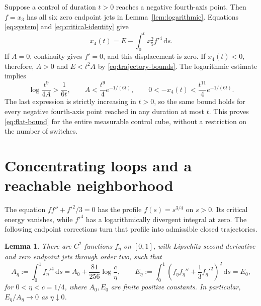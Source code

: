 \documentclass[11pt,a4paper]{article}
\newtheorem{lemma}[theorem]{Lemma}
\newcommand{\dd}{\,\mathrm{d}}
\begin{document}
Suppose a control of duration $t>0$ reaches a negative fourth-axis point.
Then $f=x_3$ has all six zero endpoint jets in
Lemma~\ref{lem:logarithmic}. Equations \eqref{eq:system} and
\eqref{eq:critical-identity} give
\begin{equation}\label{eq:fourth-displacement}
 x_4(t)=E-\int_0^t x_5^2f'^4\dd s.
\end{equation}
If $A=0$, continuity gives $f'=0$, and this displacement is zero.
If $x_4(t)<0$, therefore, $A>0$ and $E<t^2A$ by
\eqref{eq:trajectory-bounds}. The logarithmic estimate implies
\[
 \log\frac{t^9}{4A}>\frac1{6t},\qquad
 A<\frac{t^9}{4}e^{-1/(6t)},\qquad
 0<-x_4(t)<\frac{t^{11}}4e^{-1/(6t)}.
\]
The last expression is strictly increasing in $t>0$, so the same bound
holds for every negative fourth-axis point reached in any duration at most
$t$. This proves \eqref{eq:flat-bound} for the entire measurable control
cube, without a restriction on the number of switches.

\section{Concentrating loops and a reachable neighborhood}
\label{sec:controllability}

The equation $ff''+f'^2/3=0$ has the profile $f(s)=s^{3/4}$ on
$s>0$. Its critical energy vanishes, while $f'^4$ has a logarithmically
divergent integral at zero. The following endpoint corrections turn that
profile into admissible closed trajectories.

\begin{lemma}\label{lem:concentration}
There are $C^2$ functions $f_\eta$ on $[0,1]$, with Lipschitz second
derivative and zero endpoint jets through order two, such that
\begin{equation}\label{eq:concentration}
 A_\eta:=\int_0^1 f_\eta'^4\dd s
       =A_0+\frac{81}{256}\log\frac{c}{\eta},\qquad
 E_\eta:=\int_0^1\left(f_\eta f_\eta''+\frac13f_\eta'^2\right)^2\dd s
       =E_0,
\end{equation}
for $0<\eta<c=1/4$, where $A_0,E_0$ are finite positive constants.
In particular, $E_\eta/A_\eta\to0$ as $\eta\downarrow0$.
\end{lemma}
\end{document}
